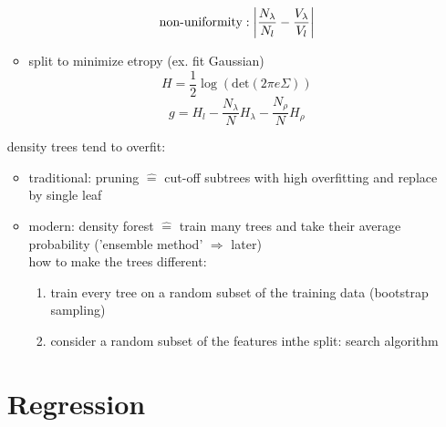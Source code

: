 \documentclass[11pt]{article}
\DeclarePairedDelimiter\abs{\lvert}{\rvert}
\begin{document}
\begin{itemize}
\begin{itemize}
                \begin{equation*}
                  \text{non-uniformity}: \abs*{\frac{N_{\lambda}}{N_l} - \frac{V_{\lambda}}{V_l}}
                \end{equation*}
                \item split to minimize etropy (ex. fit Gaussian)
                \begin{equation*}
                  H = \frac{1}{2} \log(\text{det}(2\pi e \Sigma))
                \end{equation*}
                \begin{equation*}
                  g = H_l - \frac{N_{\lambda}}{N}H_{\lambda}-\frac{N_{\rho}}{N}H_{\rho}
                \end{equation*}
              \end{itemize}
              density trees tend to overfit:
              \begin{itemize}
                \item traditional: pruning $\widehat{=}$ cut-off subtrees with high overfitting and replace by single leaf
                \item modern: density forest $\widehat{=}$ train many trees and take their average probability ('ensemble method' $\Rightarrow$ later) \\
                how to make the trees different:
                \begin{enumerate}
                  \item train every tree on a random subset of the training data (bootstrap sampling)
                  \item consider a random subset of the features inthe split: search algorithm
                \end{enumerate}
              \end{itemize}
  \section{Regression}

\end{itemize}
\end{document}
